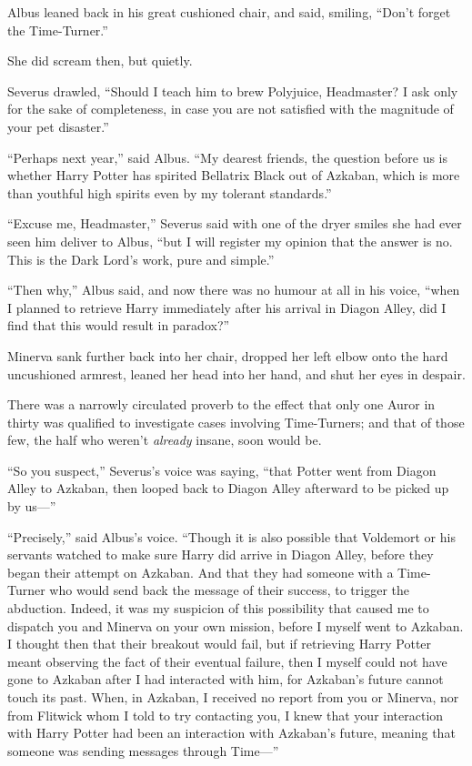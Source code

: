 Albus leaned back in his great cushioned chair, and said, smiling,
``Don't forget the Time-Turner.''

She did scream then, but quietly.

Severus drawled, ``Should I teach him to brew Polyjuice, Headmaster? I
ask only for the sake of completeness, in case you are not satisfied
with the magnitude of your pet disaster.''

``Perhaps next year,'' said Albus. ``My dearest friends, the question
before us is whether Harry Potter has spirited Bellatrix Black out of
Azkaban, which is more than youthful high spirits even by my tolerant
standards.''

``Excuse me, Headmaster,'' Severus said with one of the dryer smiles she
had ever seen him deliver to Albus, ``but I will register my opinion
that the answer is no. This is the Dark Lord's work, pure and simple.''

``Then why,'' Albus said, and now there was no humour at all in his
voice, ``when I planned to retrieve Harry immediately after his arrival
in Diagon Alley, did I find that this would result in paradox?''

Minerva sank further back into her chair, dropped her left elbow onto
the hard uncushioned armrest, leaned her head into her hand, and shut
her eyes in despair.

There was a narrowly circulated proverb to the effect that only one
Auror in thirty was qualified to investigate cases involving
Time-Turners; and that of those few, the half who weren't \emph{already}
insane, soon would be.

``So you suspect,'' Severus's voice was saying, ``that Potter went from
Diagon Alley to Azkaban, then looped back to Diagon Alley afterward to
be picked up by us---''

``Precisely,'' said Albus's voice. ``Though it is also possible that
Voldemort or his servants watched to make sure Harry did arrive in
Diagon Alley, before they began their attempt on Azkaban. And that they
had someone with a Time-Turner who would send back the message of their
success, to trigger the abduction. Indeed, it was my suspicion of this
possibility that caused me to dispatch you and Minerva on your own
mission, before I myself went to Azkaban. I thought then that their
breakout would fail, but if retrieving Harry Potter meant observing the
fact of their eventual failure, then I myself could not have gone to
Azkaban after I had interacted with him, for Azkaban's future cannot
touch its past. When, in Azkaban, I received no report from you or
Minerva, nor from Flitwick whom I told to try contacting you, I knew
that your interaction with Harry Potter had been an interaction with
Azkaban's future, meaning that someone was sending messages through
Time---''

